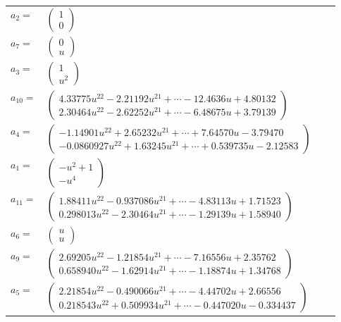\documentclass[1p]{elsarticle_modified}
\theoremstyle{definition}
\begin{document}
\begin{tabular}{m{7pt} m{180pt} m{7pt} m{180pt} }
\flushright $a_{2}=$&$\begin{pmatrix}1\\0\end{pmatrix}$ \\
\flushright $a_{7}=$&$\begin{pmatrix}0\\u\end{pmatrix}$ \\
\flushright $a_{3}=$&$\begin{pmatrix}1\\u^2\end{pmatrix}$ \\
\flushright $a_{10}=$&$\begin{pmatrix}4.33775 u^{22}-2.21192 u^{21}+\cdots-12.4636 u+4.80132\\2.30464 u^{22}-2.62252 u^{21}+\cdots-6.48675 u+3.79139\end{pmatrix}$ \\
\flushright $a_{4}=$&$\begin{pmatrix}-1.14901 u^{22}+2.65232 u^{21}+\cdots+7.64570 u-3.79470\\-0.0860927 u^{22}+1.63245 u^{21}+\cdots+0.539735 u-2.12583\end{pmatrix}$ \\
\flushright $a_{1}=$&$\begin{pmatrix}- u^2+1\\- u^4\end{pmatrix}$ \\
\flushright $a_{11}=$&$\begin{pmatrix}1.88411 u^{22}-0.937086 u^{21}+\cdots-4.83113 u+1.71523\\0.298013 u^{22}-2.30464 u^{21}+\cdots-1.29139 u+1.58940\end{pmatrix}$ \\
\flushright $a_{6}=$&$\begin{pmatrix}u\\u\end{pmatrix}$ \\
\flushright $a_{9}=$&$\begin{pmatrix}2.69205 u^{22}-1.21854 u^{21}+\cdots-7.16556 u+2.35762\\0.658940 u^{22}-1.62914 u^{21}+\cdots-1.18874 u+1.34768\end{pmatrix}$ \\
\flushright $a_{5}=$&$\begin{pmatrix}2.21854 u^{22}-0.490066 u^{21}+\cdots-4.44702 u+2.66556\\0.218543 u^{22}+0.509934 u^{21}+\cdots-0.447020 u-0.334437\end{pmatrix}$ \\

\end{tabular}
\end{document}
